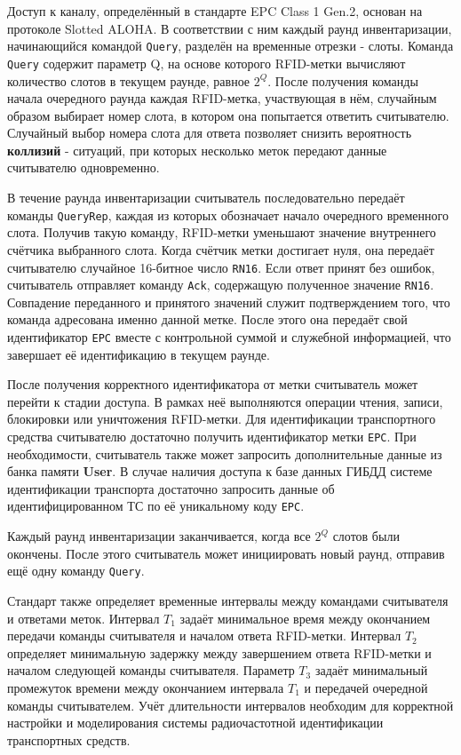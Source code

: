 \documentclass[12pt]{article}
\theoremstyle{definition}
\begin{document}
Доступ к каналу, определённый в стандарте EPC Class 1 Gen.2, основан на протоколе Slotted ALOHA. В соответствии с ним каждый раунд инвентаризации, начинающийся командой \texttt{Query}, разделён на временные отрезки - слоты. Команда \texttt{Query} содержит параметр Q, на основе которого RFID-метки вычисляют количество слотов в текущем раунде, равное \(2^Q\). После получения команды начала очередного раунда каждая RFID-метка, участвующая в нём, случайным образом выбирает номер слота, в котором она попытается ответить считывателю. Случайный выбор номера слота для ответа позволяет снизить вероятность \textbf{коллизий} - ситуаций, при которых несколько меток передают данные считывателю одновременно.

В течение раунда инвентаризации считыватель последовательно передаёт команды \texttt{QueryRep}, каждая из которых обозначает начало очередного временного слота. Получив такую команду, RFID-метки уменьшают значение внутреннего счётчика выбранного слота. Когда счётчик метки достигает нуля, она передаёт считывателю случайное 16-битное число \texttt{RN16}. Если ответ принят без ошибок, считыватель отправляет команду \texttt{Ack}, содержащую полученное значение \texttt{RN16}. Совпадение переданного и принятого значений служит подтверждением того, что команда адресована именно данной метке. После этого она передаёт свой идентификатор \texttt{EPC} вместе с контрольной суммой и служебной информацией, что завершает её идентификацию в текущем раунде.

После получения корректного идентификатора от метки считыватель может перейти к стадии доступа. В рамках неё выполняются операции чтения, записи, блокировки или уничтожения RFID-метки. Для идентификации транспортного средства считывателю достаточно получить идентификатор метки \texttt{EPC}. При необходимости, считыватель также может запросить дополнительные данные из банка памяти \textbf{User}. В случае наличия доступа к базе данных ГИБДД системе идентификации транспорта достаточно запросить данные об идентифицированном ТС по её уникальному коду \texttt{EPC}.

Каждый раунд инвентаризации заканчивается, когда все $2^Q$ слотов были окончены. После этого считыватель может инициировать новый раунд, отправив ещё одну команду \texttt{Query}.

Стандарт также определяет временные интервалы между командами считывателя и ответами меток. Интервал \(T_1\) задаёт минимальное время между окончанием передачи команды считывателя и началом ответа RFID-метки. Интервал \(T_2\) определяет минимальную задержку между завершением ответа RFID-метки и началом следующей команды считывателя. Параметр \(T_3\) задаёт минимальный промежуток времени между окончанием интервала \(T_1\) и передачей очередной команды считывателем. Учёт длительности интервалов необходим для корректной настройки и моделирования системы радиочастотной идентификации транспортных средств.
\end{document}
